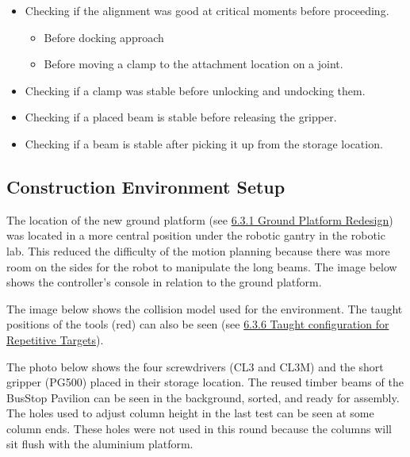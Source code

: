 \begin{itemize}
	\item Checking if the alignment was good at critical moments before proceeding.

\begin{itemize}
	\item Before docking approach

	\item Before moving a clamp to the attachment location on a joint.

\end{itemize}
	\item Checking if a clamp was stable before unlocking and undocking them.

	\item Checking if a placed beam is stable before releasing the gripper.

	\item Checking if a beam is stable after picking it up from the storage location.

\end{itemize}
\subsection{Construction Environment Setup}

The location of the new ground platform (see \ul{6.3.1 Ground Platform Redesign}) was located in a more central position under the robotic gantry in the robotic lab. This reduced the difficulty of the motion planning because there was more room on the sides for the robot to manipulate the long beams. The image below shows the controller’s console in relation to the ground platform.




The image below shows the collision model used for the environment. The taught positions of the tools (red) can also be seen (see \ul{6.3.6 Taught configuration for Repetitive Targets}).




The photo below shows the four screwdrivers (CL3 and CL3M) and the short gripper (PG500) placed in their storage location. The reused timber beams of the BusStop Pavilion can be seen in the background, sorted, and ready for assembly. The holes used to adjust column height in the last test can be seen at some column ends. These holes were not used in this round because the columns will sit flush with the aluminium platform.

